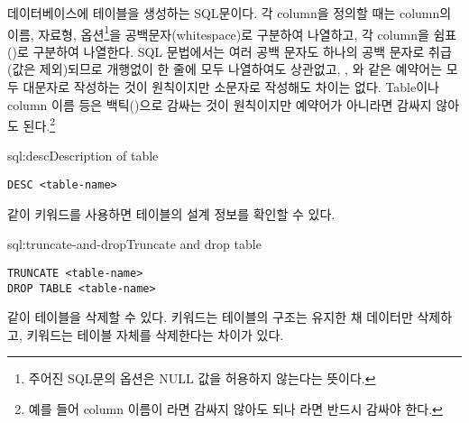 \는 데이터베이스에  테이블을 생성하는 SQL문이다. 각 column을 정의할 때는 column의 이름, 자료형, 옵션\footnote{주어진 SQL문의  옵션은 NULL 값을 허용하지 않는다는 뜻이다.}을 공백문자(whitespace)로 구분하여 나열하고, 각 column을 쉼표(\cd{,})로 구분하여 나열한다. SQL 문법에서는 여러 공백 문자도 하나의 공백 문자로 취급(값은 제외)되므로 개행없이 한 줄에 모두 나열하여도 상관없고, , 와 같은 예약어는 모두 대문자로 작성하는 것이 원칙이지만 소문자로 작성해도 차이는 없다. Table이나 column 이름 등은 백틱()으로 감싸는 것이 원칙이지만 예약어가 아니라면 감싸지 않아도 된다.\footnote{예를 들어 column 이름이 라면 감싸지 않아도 되나 라면 반드시 감싸야 한다.}

\begin{sql}{sql:desc}{Description of table}
\begin{verbatim}
DESC <table-name>
\end{verbatim}
\end{sql}

\과 같이  키워드를 사용하면 테이블의 설계 정보를 확인할 수 있다.

\begin{sql}{sql:truncate-and-drop}{Truncate and drop table}
\begin{verbatim}
TRUNCATE <table-name>
DROP TABLE <table-name>
\end{verbatim}
\end{sql}

\과 같이 테이블을 삭제할 수 있다.  키워드는 테이블의 구조는 유지한 채 데이터만 삭제하고,  키워드는 테이블 자체를 삭제한다는 차이가 있다.
